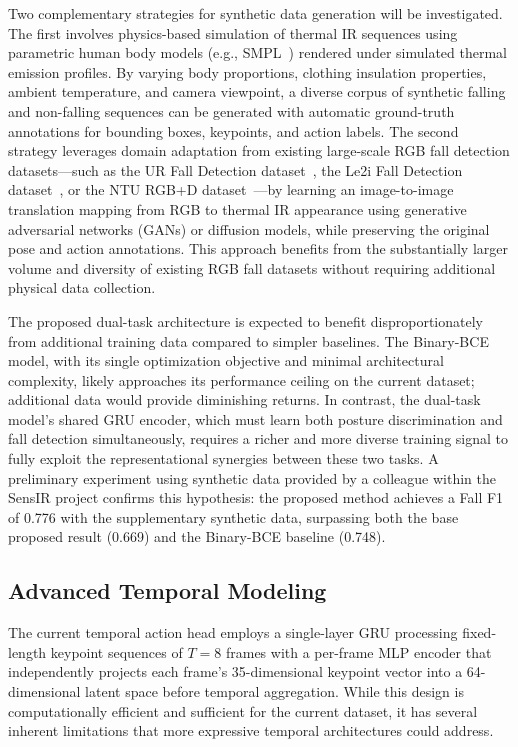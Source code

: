 Two complementary strategies for synthetic data generation will be investigated. The first involves physics-based simulation of thermal IR sequences using parametric human body models (e.g., SMPL~\cite{loper2015smpl}) rendered under simulated thermal emission profiles. By varying body proportions, clothing insulation properties, ambient temperature, and camera viewpoint, a diverse corpus of synthetic falling and non-falling sequences can be generated with automatic ground-truth annotations for bounding boxes, keypoints, and action labels. The second strategy leverages domain adaptation from existing large-scale RGB fall detection datasets---such as the UR Fall Detection dataset~\cite{kwolek2014human}, the Le2i Fall Detection dataset~\cite{charfi2013optimized}, or the NTU RGB+D dataset~\cite{shahroudy2016ntu}---by learning an image-to-image translation mapping from RGB to thermal IR appearance using generative adversarial networks (GANs) or diffusion models, while preserving the original pose and action annotations. This approach benefits from the substantially larger volume and diversity of existing RGB fall datasets without requiring additional physical data collection.

The proposed dual-task architecture is expected to benefit disproportionately from additional training data compared to simpler baselines. The Binary-BCE model, with its single optimization objective and minimal architectural complexity, likely approaches its performance ceiling on the current dataset; additional data would provide diminishing returns. In contrast, the dual-task model's shared GRU encoder, which must learn both posture discrimination and fall detection simultaneously, requires a richer and more diverse training signal to fully exploit the representational synergies between these two tasks. A preliminary experiment using synthetic data provided by a colleague within the SensIR project confirms this hypothesis: the proposed method achieves a Fall F1 of 0.776 with the supplementary synthetic data, surpassing both the base proposed result (0.669) and the Binary-BCE baseline (0.748).

\subsection{Advanced Temporal Modeling}
\label{sec:outlook_temporal}

The current temporal action head employs a single-layer GRU processing fixed-length keypoint sequences of $T = 8$ frames with a per-frame MLP encoder that independently projects each frame's 35-dimensional keypoint vector into a 64-dimensional latent space before temporal aggregation. While this design is computationally efficient and sufficient for the current dataset, it has several inherent limitations that more expressive temporal architectures could address.

